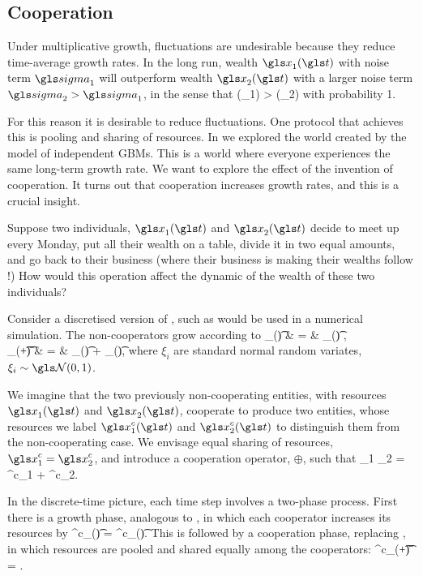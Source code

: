 
\subsection{Cooperation}
Under multiplicative growth, fluctuations are undesirable because they reduce 
time-average growth rates. In the long run, wealth $\x_1(\t)$ with noise term 
$\gsigma_1$ will outperform wealth $\x_2(\t)$ with a larger 
noise term $\gsigma_2>\gsigma_1$, in the sense that 
\be
\gt(\x_1) > \gt(\x_2)
\ee
with probability 1.

For this reason it is desirable to reduce fluctuations. One protocol that achieves this is pooling and sharing of resources. In  we explored the world created 
by the model of independent GBMs. This is a world where everyone experiences the 
same long-term growth rate. We want to explore the effect of the invention of 
cooperation. It turns out that cooperation increases growth rates, and this is a 
crucial insight. 

Suppose two individuals, $\x_1(\t)$ and $\x_2(\t)$ decide to meet up every Monday, put all their wealth on a table, divide it in two equal amounts, and go back to their business (where their business is making their wealths follow \GBM!) How 
would this operation affect the dynamic of the wealth of these two individuals?

Consider a discretised version of , such as would be used in a numerical simulation. The non-cooperators grow according to
 \bea
 \D \x_\gi(\t) & = & \x_\gi(\t) ,  \\
 \x_\gi(\t+\D\t) & = & \x_\gi(\t) + \D \x_\gi(\t), 
 \eea
 where $\xi_i$ are standard normal random variates, $\xi_i\sim \mathcal{\N}(0,1)$.

We imagine that the two previously non-cooperating entities, with resources $\x_1(\t)$ and $\x_2(\t)$, cooperate to produce two entities, whose resources we label $\x^c_1(\t)$ and $\x^c_2(\t)$ to distinguish them from the non-cooperating case. We envisage equal sharing of resources, $\x^c_1=\x^c_2$, and introduce a cooperation operator, $\oplus$, such that
 \be
 \x_1 \oplus \x_2 = \x^c_1 + \x^c_2.
 \ee
 
 In the discrete-time picture, each time step involves a two-phase process. First there is a growth phase, analogous to , in which each cooperator increases its resources by
 \be
 \D \x^c_\gi(\t) = \x^c_\gi(\t)\left[\gmu\D\t + \gsigma\sqrt{\D\t}\,\xi_\gi\right].
 \ee
 This is followed by a cooperation phase, replacing , in which resources are pooled and shared equally among the cooperators:
 \be
 \x^c_\gi(\t+\D\t) = .
 \ee
 
